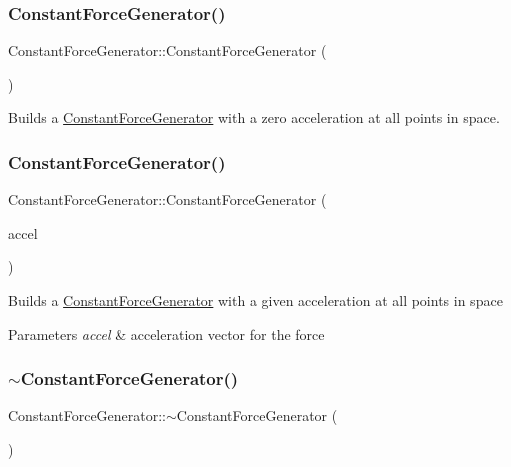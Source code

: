 \subsubsection{\texorpdfstring{Constant\+Force\+Generator()}{ConstantForceGenerator()}\hspace{0.1cm}{\footnotesize\ttfamily [1/2]}}
{\footnotesize\ttfamily Constant\+Force\+Generator\+::\+Constant\+Force\+Generator (\begin{DoxyParamCaption}{ }\end{DoxyParamCaption})}

Builds a \hyperlink{classConstantForceGenerator}{Constant\+Force\+Generator} with a zero acceleration at all points in space. \mbox{\label{classConstantForceGenerator_a6ff2c05d06addf1859a604c6dbb8f9bd}} 
\subsubsection{\texorpdfstring{Constant\+Force\+Generator()}{ConstantForceGenerator()}\hspace{0.1cm}{\footnotesize\ttfamily [2/2]}}
{\footnotesize\ttfamily Constant\+Force\+Generator\+::\+Constant\+Force\+Generator (\begin{DoxyParamCaption}\item[{Vector3\+Gf}]{accel }\end{DoxyParamCaption})}

Builds a \hyperlink{classConstantForceGenerator}{Constant\+Force\+Generator} with a given acceleration at all points in space 
\begin{DoxyParams}{Parameters}
{\em accel} & acceleration vector for the force \\
\hline
\end{DoxyParams}
\mbox{\label{classConstantForceGenerator_a3563efee2f73fd5c2e504db89b4d3767}} 
\subsubsection{\texorpdfstring{$\sim$\+Constant\+Force\+Generator()}{~ConstantForceGenerator()}}
{\footnotesize\ttfamily Constant\+Force\+Generator\+::$\sim$\+Constant\+Force\+Generator (\begin{DoxyParamCaption}{ }\end{DoxyParamCaption})}

